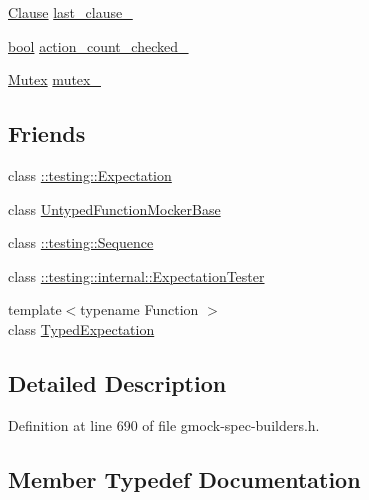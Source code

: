 \begin{DoxyCompactItemize}
\item 
\hyperlink{classtesting_1_1internal_1_1ExpectationBase_a450f34b979ec5814c91d4eab6b78cfc2}{Clause} \hyperlink{classtesting_1_1internal_1_1ExpectationBase_a584f296e53b4cc002ddf5e65e44d72d9}{last\+\_\+clause\+\_\+}
\item 
\hyperlink{classbool}{bool} \hyperlink{classtesting_1_1internal_1_1ExpectationBase_a19933e346f6493005437bdd6812c7a29}{action\+\_\+count\+\_\+checked\+\_\+}
\item 
\hyperlink{classtesting_1_1internal_1_1Mutex}{Mutex} \hyperlink{classtesting_1_1internal_1_1ExpectationBase_a364f5473591d08d0ac03595c9050c13e}{mutex\+\_\+}
\end{DoxyCompactItemize}
\subsection*{Friends}
\begin{DoxyCompactItemize}
\item 
class \hyperlink{classtesting_1_1internal_1_1ExpectationBase_a86fa3dccdc465d897ee321b74e4ce915}{\+::testing\+::\+Expectation}
\item 
class \hyperlink{classtesting_1_1internal_1_1ExpectationBase_a3e5598b244ec7673d0a494477d71e559}{Untyped\+Function\+Mocker\+Base}
\item 
class \hyperlink{classtesting_1_1internal_1_1ExpectationBase_aeaf43a487a21c0ac1135b094a1561056}{\+::testing\+::\+Sequence}
\item 
class \hyperlink{classtesting_1_1internal_1_1ExpectationBase_a83859ffda7f75bb8b447063eb53cb8b8}{\+::testing\+::internal\+::\+Expectation\+Tester}
\item 
{\footnotesize template$<$typename Function $>$ }\\class \hyperlink{classtesting_1_1internal_1_1ExpectationBase_a4f17de55396a8ef740d5ad2b1380a851}{Typed\+Expectation}
\end{DoxyCompactItemize}


\subsection{Detailed Description}


Definition at line 690 of file gmock-\/spec-\/builders.\+h.



\subsection{Member Typedef Documentation}
\mbox{\label{classtesting_1_1internal_1_1ExpectationBase_a9b21e82059961b9f1198d3f5d518254f}} 
